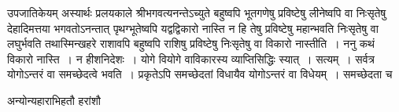 \documentclass[11pt, openany]{book}
\begin{document}
उपजातिकेयम् अस्यार्थः प्रलयकाले श्रीभगवत्यनन्तेऽच्युते बहुष्वपि
भूतगणेषु प्रविष्टेषु लीनेष्वपि वा निःसृतेषु देहादिमत्तया भगवतोऽनन्तात्
पृथग्भूतेष्वपि
\newpage
\noindent यद्वद्विकारो नास्ति न हि तेषु प्रविष्टेषु महान्भवति निःसृतेषु वा
लघुर्भवति तथास्मिन्खहरे राशावपि बहुष्वपि राशिषु प्रविष्टेषु निःसृतेषु वा विकारो नास्तीति~।
ननु कथं विकारो नास्ति~। न हीशनिदेशः~। योगे वियोगे वाविकारस्य व्याप्तिसिद्धिः
स्यात्~। सत्यम्~। सर्वत्र योगोऽन्तरं वा समच्छेदत्वे भवति~। प्रकृतेऽपि समच्छेदतां
विधायैव योगोऽन्तरं वा विधेयम्~। समच्छेदता च\textendash 
\vspace{-2mm}

\begin{center}
    \q अन्योन्यहाराभिहतौ हरांशौ
\end{center}
\vspace{-2mm}
\end{document}
